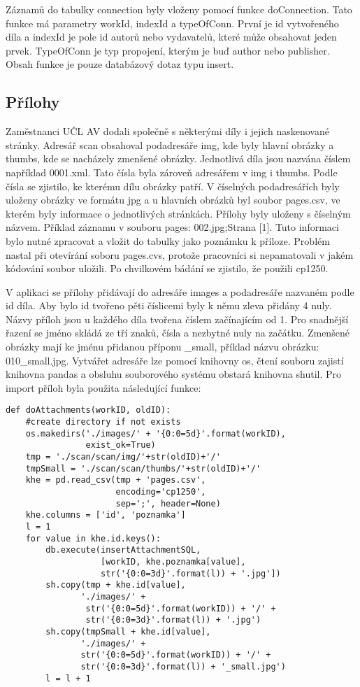             Záznamů do tabulky connection byly vloženy pomocí funkce doConnection. Tato funkce má parametry workId, indexId a typeOfConn. První je id vytvořeného díla a indexId je pole id autorů nebo vydavatelů, které může obsahovat jeden prvek. TypeOfConn je typ propojení, kterým je buď author nebo publisher. Obsah funkce je pouze databázový dotaz typu insert.
            
        \subsection{Přílohy}
            Zaměstnanci UČL AV dodali společně s některými díly i jejich naskenované stránky. Adresář scan obsahoval  podadresáře img, kde byly hlavní obrázky a thumbs, kde se nacházely zmenšené obrázky. Jednotlivá díla jsou nazvána číslem například 0001.xml. Tato čísla byla zároveň adresářem v img i thumbs. Podle čísla se zjistilo, ke kterému dílu obrázky patří. V číselných podadresářích byly uloženy obrázky ve formátu jpg a u hlavních obrázků byl soubor pages.csv, ve kterém byly informace o jednotlivých stránkách. Přílohy byly uloženy s číselným názvem. Příklad záznamu v souboru pages: 002.jpg;Strana [1]. Tuto informaci bylo nutné zpracovat a vložit do tabulky jako poznámku k příloze. Problém nastal při otevírání soboru pages.cvs, protože pracovníci si nepamatovali v jakém kódování soubor uložili. Po chvilkovém bádání se zjistilo, že použili cp1250. 
            
            V aplikaci se přílohy přidávají do adresáře images a podadresáře nazvaném podle id díla. Aby bylo id tvořeno pěti číslicemi byly k němu zleva přidány 4 nuly. Názvy příloh jsou u každého díla tvořena číslem začínajícím od 1. Pro snadnější řazení se jméno skládá ze tří znaků, čísla a nezbytné nuly na začátku. Zmenšené obrázky mají ke jménu přidanou příponu \_small, příklad názvu obrázku: 010\_small.jpg. Vytvářet adresáře lze pomocí knihovny os, čtení souboru zajistí knihovna pandas a obsluhu souborového systému obstará knihovna shutil. Pro import příloh byla použita následující funkce:

            \begin{verbatim}
def doAttachments(workID, oldID):
    #create directory if not exists
    os.makedirs('./images/' + '{0:0=5d}'.format(workID),
                exist_ok=True)
    tmp = './scan/scan/img/'+str(oldID)+'/'
    tmpSmall = './scan/scan/thumbs/'+str(oldID)+'/'
    khe = pd.read_csv(tmp + 'pages.csv',
                      encoding='cp1250',
                      sep=';', header=None)
    khe.columns = ['id', 'poznamka']
    l = 1
    for value in khe.id.keys():
        db.execute(insertAttachmentSQL,
                   [workID, khe.poznamka[value],
                   str('{0:0=3d}'.format(l)) + '.jpg'])
        sh.copy(tmp + khe.id[value], 
               './images/' + 
                str('{0:0=5d}'.format(workID)) + '/' +
                str('{0:0=3d}'.format(l)) + '.jpg')
        sh.copy(tmpSmall + khe.id[value], 
               './images/' + 
               str('{0:0=5d}'.format(workID)) + '/' +
               str('{0:0=3d}'.format(l)) + '_small.jpg')
        l = l + 1
            \end{verbatim}

